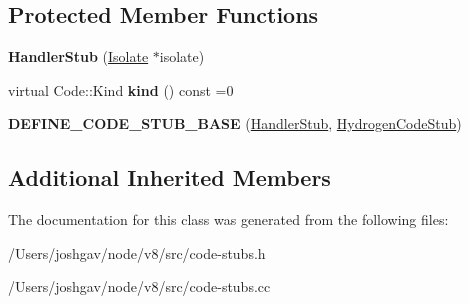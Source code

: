 \subsection*{Protected Member Functions}
\begin{DoxyCompactItemize}
\item 
{\bfseries Handler\+Stub} (\hyperlink{classv8_1_1internal_1_1_isolate}{Isolate} $\ast$isolate)\hypertarget{classv8_1_1internal_1_1_handler_stub_ab270255ab1c2683a07692658637ac35e}{}\label{classv8_1_1internal_1_1_handler_stub_ab270255ab1c2683a07692658637ac35e}

\item 
virtual Code\+::\+Kind {\bfseries kind} () const  =0\hypertarget{classv8_1_1internal_1_1_handler_stub_ad86962d69cf7613521df7e6f8c4784df}{}\label{classv8_1_1internal_1_1_handler_stub_ad86962d69cf7613521df7e6f8c4784df}

\item 
{\bfseries D\+E\+F\+I\+N\+E\+\_\+\+C\+O\+D\+E\+\_\+\+S\+T\+U\+B\+\_\+\+B\+A\+SE} (\hyperlink{classv8_1_1internal_1_1_handler_stub}{Handler\+Stub}, \hyperlink{classv8_1_1internal_1_1_hydrogen_code_stub}{Hydrogen\+Code\+Stub})\hypertarget{classv8_1_1internal_1_1_handler_stub_acd7c35b3c2fc2e2a4c004c069e34fe7a}{}\label{classv8_1_1internal_1_1_handler_stub_acd7c35b3c2fc2e2a4c004c069e34fe7a}

\end{DoxyCompactItemize}
\subsection*{Additional Inherited Members}


The documentation for this class was generated from the following files\+:\begin{DoxyCompactItemize}
\item 
/\+Users/joshgav/node/v8/src/code-\/stubs.\+h\item 
/\+Users/joshgav/node/v8/src/code-\/stubs.\+cc\end{DoxyCompactItemize}
